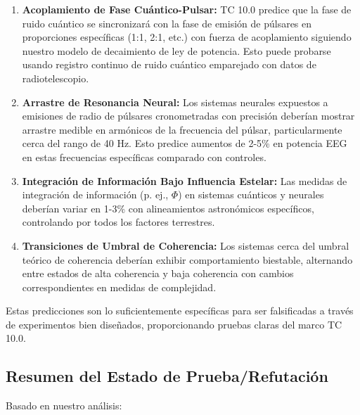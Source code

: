 \documentclass[12pt]{article}
\begin{document}
\begin{enumerate}
    \item \textbf{Acoplamiento de Fase Cuántico-Pulsar:} TC 10.0 predice que la fase de ruido cuántico se sincronizará con la fase de emisión de púlsares en proporciones específicas (1:1, 2:1, etc.) con fuerza de acoplamiento siguiendo nuestro modelo de decaimiento de ley de potencia. Esto puede probarse usando registro continuo de ruido cuántico emparejado con datos de radiotelescopio.
    
    \item \textbf{Arrastre de Resonancia Neural:} Los sistemas neurales expuestos a emisiones de radio de púlsares cronometradas con precisión deberían mostrar arrastre medible en armónicos de la frecuencia del púlsar, particularmente cerca del rango de 40 Hz. Esto predice aumentos de 2-5\% en potencia EEG en estas frecuencias específicas comparado con controles.
    
    \item \textbf{Integración de Información Bajo Influencia Estelar:} Las medidas de integración de información (p. ej., $\Phi$) en sistemas cuánticos y neurales deberían variar en 1-3\% con alineamientos astronómicos específicos, controlando por todos los factores terrestres.
    
    \item \textbf{Transiciones de Umbral de Coherencia:} Los sistemas cerca del umbral teórico de coherencia deberían exhibir comportamiento biestable, alternando entre estados de alta coherencia y baja coherencia con cambios correspondientes en medidas de complejidad.
\end{enumerate}

Estas predicciones son lo suficientemente específicas para ser falsificadas a través de experimentos bien diseñados, proporcionando pruebas claras del marco TC 10.0.

\subsection{Resumen del Estado de Prueba/Refutación}

Basado en nuestro análisis:
\end{document}
